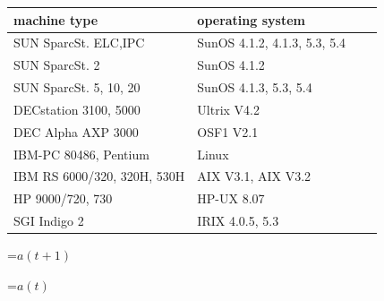 {\newpage
\clearpage
\samepage \begin{table}\begin{center}
\begin{tabular} {|l|l|c|c|}
\hline
{\bf machine type} & {\bf operating system}\\ 
\hline
SUN SparcSt. ELC,IPC            & SunOS 4.1.2, 4.1.3, 5.3, 5.4\\ 
SUN SparcSt. 2                  & SunOS 4.1.2\\ 
SUN SparcSt. 5, 10, 20          & SunOS 4.1.3, 5.3, 5.4\\ 
DECstation 3100, 5000           & Ultrix V4.2\\ 
DEC Alpha AXP 3000              & OSF1 V2.1\\ 
IBM-PC 80486, Pentium           & Linux\\ 
IBM RS 6000/320, 320H, 530H     & AIX V3.1, AIX V3.2\\ 
HP 9000/720, 730                & HP-UX 8.07\\ 
SGI Indigo 2                    & IRIX 4.0.5, 5.3\\ 
\hline
\end{tabular}

\label{TabMachine}
\end{center}
\end{table}
}

{\newpage
\clearpage
\samepage \begin{figure}[htbp]
\begin{center}
  \begin{minipage}{\textwidth}
  \end{minipage}

\label{PicSimpleNet}
\end{center}
\end{figure}
}

{\newpage
\clearpage
\samepage \setbox\sizebox=\hbox{$a(t+1)$}\box\sizebox
}

{\newpage
\clearpage
\samepage \setbox\sizebox=\hbox{$a(t)$}\box\sizebox
}

{\newpage
\clearpage
\samepage \begin{figure}[htbp]
\begin{center}
  \begin{minipage}{\textwidth}
  \end{minipage}

\label{PicUnitsWithSites}
\end{center}
\end{figure}
}

